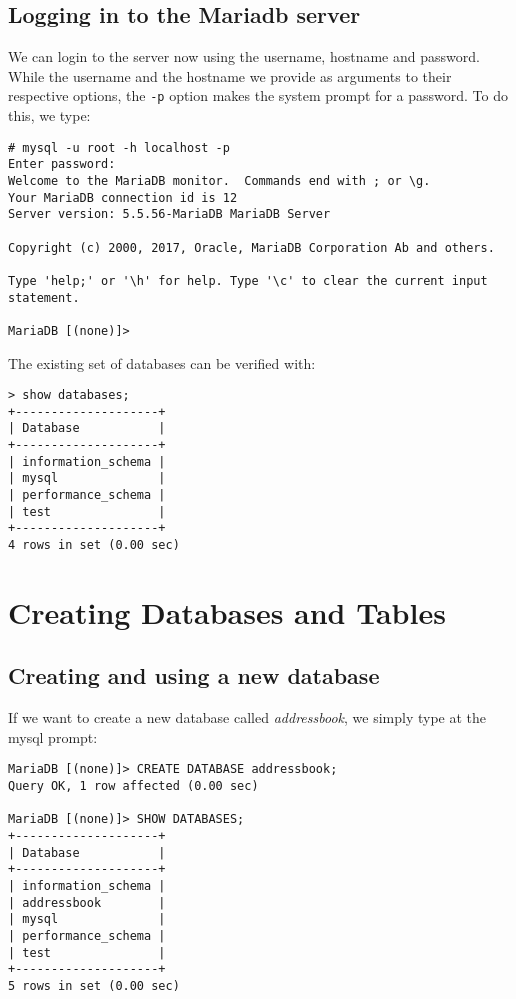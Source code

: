 \subsection{Logging in to the Mariadb server}
We can login to the server now using the username, hostname and password. While the username and the hostname we provide as arguments to their respective options, the \verb|-p| option makes the system prompt for a password. To do this, we type:

\vspace{-15pt}
\begin{verbatim}
# mysql -u root -h localhost -p
Enter password: 
Welcome to the MariaDB monitor.  Commands end with ; or \g.
Your MariaDB connection id is 12
Server version: 5.5.56-MariaDB MariaDB Server

Copyright (c) 2000, 2017, Oracle, MariaDB Corporation Ab and others.

Type 'help;' or '\h' for help. Type '\c' to clear the current input statement.

MariaDB [(none)]> 
\end{verbatim}
\vspace{-10pt}	

\noindent
The existing set of databases can be verified with:

\vspace{-15pt}
\begin{verbatim}
> show databases;
+--------------------+
| Database           |
+--------------------+
| information_schema |
| mysql              |
| performance_schema |
| test               |
+--------------------+
4 rows in set (0.00 sec)
\end{verbatim}
\vspace{-10pt}	

	\section{Creating Databases and Tables}
\subsection{Creating and using a new database}
If we want to create a new database called \textit{addressbook}, we simply type at the mysql prompt:

\vspace{-15pt}
\begin{verbatim}
MariaDB [(none)]> CREATE DATABASE addressbook;
Query OK, 1 row affected (0.00 sec)

MariaDB [(none)]> SHOW DATABASES;
+--------------------+
| Database           |
+--------------------+
| information_schema |
| addressbook        |
| mysql              |
| performance_schema |
| test               |
+--------------------+
5 rows in set (0.00 sec)
\end{verbatim}
\vspace{-10pt}	

